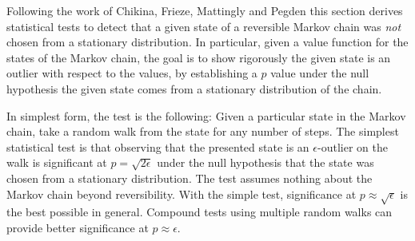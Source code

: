 \documentclass[12pt]{article}
\begin{document}

Following the work of Chikina, Frieze, Mattingly and Pegden
\cite{doi:10.1080/2330443X.2020.1806763, Chikina2860, Chikina2019} this
section derives statistical tests to detect that a given state of a
reversible Markov chain was \emph{not} chosen from a stationary
distribution.  In particular, given a value function for the states of
the Markov chain, the goal is to show rigorously the given state is an
outlier with respect to the values, by establishing a \( p \) value
under the null hypothesis the given state comes from a stationary
distribution of the chain.

In simplest form, the test is the following:  Given a particular state
in the Markov chain, take a random walk from the state for any
number of steps.  The simplest statistical test is that observing that
the presented state is an \( \epsilon \)-outlier on the walk is
significant at \( p = \sqrt{2\epsilon} \) under the null hypothesis that
the state was chosen from a stationary distribution.  The test assumes
nothing about the Markov chain beyond reversibility.  With the simple
test, significance at \( p \approx \sqrt{\epsilon} \) is the best
possible in general.  Compound tests using multiple random
walks can provide better significance at \( p \approx \epsilon \).
\end{document}
